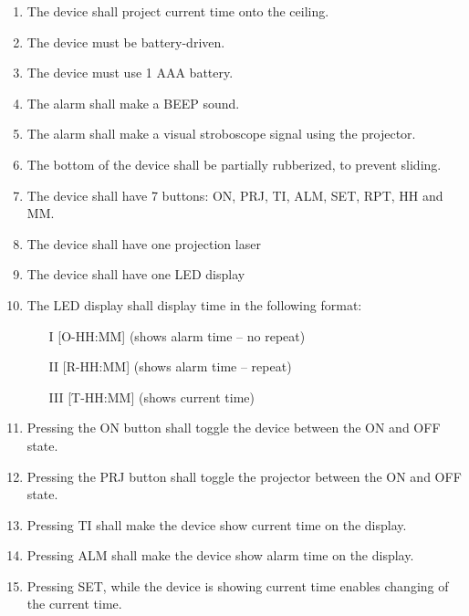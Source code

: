 \documentclass[Main_Assignment2]{subfiles}
\begin{document}
\begin{enumerate}[RE\arabic*:]
	\item 
	The device shall project current time onto the ceiling.
	
	\item 
	The device must be battery-driven.

	\item
	The device must use 1 AAA battery.

	\item
	The alarm shall make a BEEP sound.

	\item 
	The alarm shall make a visual stroboscope signal using the projector.

	\item
	The bottom of the device shall be partially rubberized, to prevent sliding.

	\item
	The device shall have 7 buttons: ON, PRJ, TI, ALM, SET, RPT, HH and MM.

	\item
	The device shall have one projection laser

	\item
	The device shall have one LED display

	\item
	The LED display shall display time in the following format:

	\begin{itemize}
		\item [I] [O-HH:MM] (shows alarm time – no repeat)
		\item [II] [R-HH:MM] (shows alarm time – repeat)
		\item [III] [T-HH:MM] (shows current time)

	\end{itemize}

	\item
	Pressing the ON button shall toggle the device between the ON and OFF state.

	\item
	Pressing the PRJ button shall toggle the projector between the ON and OFF state.	

	\item
	Pressing TI shall make the device show current time on the display.

	\item
	Pressing ALM shall make the device show alarm time on the display.

	\item
	Pressing SET, while the device is showing current time enables changing of the current time.


\end{enumerate}
\end{document}
